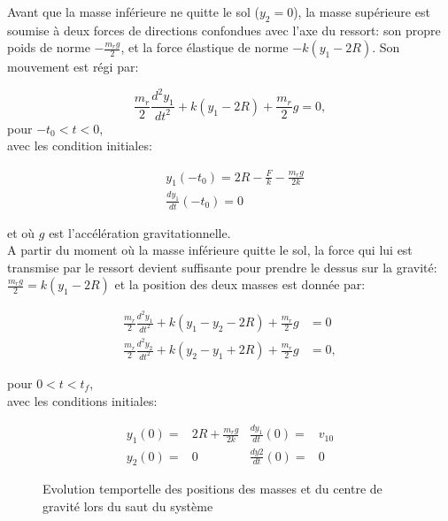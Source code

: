 $$
$$
$$
$$


Avant que la masse inférieure ne quitte le sol ($y_2=0$), la masse supérieure est soumise à deux forces de directions confondues avec l'axe du ressort: son propre poids de norme $-\frac{m_r g}{2}$, et la force élastique de norme $-k(y_1-2R)$. Son mouvement est régi par:

\begin{equation}
    \frac{m_r}{2}\frac{d^2y_1}{dt^2}+k(y_1-2R)+\frac{m_r}{2}g=0,
  \label{eq:1}
\end{equation}
pour $-t_0<t<0$,\\

avec les condition initiales:

\begin{align}
    &y_1(-t_0)=2R-\frac{F}{k}-\frac{m_r g}{2k} \nonumber\\
    &\frac{dy_1}{dt}(-t_0)=0
\label{eq:1i}
\end{align}


et où $g$ est l'accélération gravitationnelle. \\
  
A partir du moment où la masse inférieure quitte le sol, la force qui lui est transmise par le ressort devient suffisante pour prendre le dessus sur la gravité: $\frac{m_r g}{2}=k(y_1-2R)$  et la position des deux masses est donnée par:

\begin{align}
    \frac{m_r}{2}\frac{d^2y_1}{dt^2}+k(y_1-y_2-2R)+\frac{m_r}{2}g&=0 \nonumber\\
    \frac{m_r}{2}\frac{d^2y_2}{dt^2}+k(y_2-y_1+2R)+\frac{m_r}{2}g&=0,
  \label{eq:3}
\end{align}

pour $0<t<t_f$,\\
avec les conditions initiales: 

\begin{align}
    y_1(0)=&2R+\frac{m_r g}{2k} & \frac{d y_1}{dt}(0)=&v_{10}\nonumber\\
    y_2(0)=&0 & \frac{d y2}{dt}(0)=&0
  \label{eq:4}
\end{align}    
    


\begin{figure}[htb]
\centering
\def\svgwidth{350}


\caption{Evolution temportelle des positions des masses et du centre de gravité lors du saut du système}
\label{fig:saut}
\end{figure}


